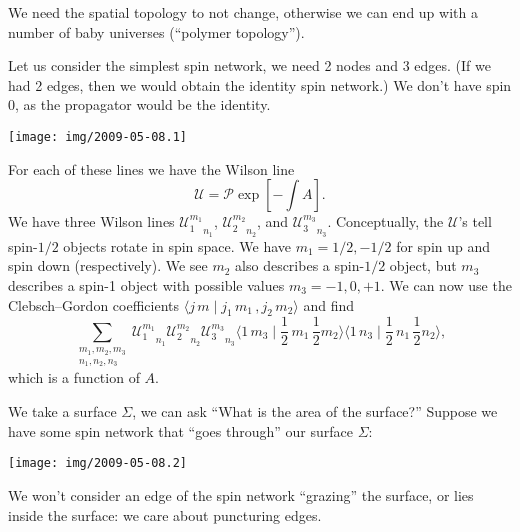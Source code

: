 \lecture

We need the spatial topology to not change, otherwise we can end up with
a number of baby universes (``polymer topology'').

Let us consider the simplest spin network, we need 2 nodes and 3
edges. (If we had 2 edges, then we would obtain the identity spin
network.)
We don't have spin 0, as the propagator would be the identity.
\begin{center}
  \texttt{[image: img/2009-05-08.1]}
\end{center}
For each of these lines we have the Wilson line
\begin{equation}
\mathcal{U} = \mathcal{P}\exp[-\int A].
\end{equation}
We have three Wilson lines ${\mathcal{U}^{m_{1}}_{1}}_{n_{1}}$,
${\mathcal{U}^{m_{2}}_{2}}_{n_{2}}$, and ${\mathcal{U}^{m_{3}}_{3}}_{n_{3}}$.
Conceptually, the $\mathcal{U}$'s tell spin-$1/2$ objects rotate in spin
space. We have $m_{1}=1/2, -1/2$ for spin up and spin down (respectively).
We see $m_{2}$ also describes a spin-$1/2$ object, but $m_{3}$ describes
a spin-1 object with possible values $m_{3}=-1,0,+1$. We can now use the
Clebsch--Gordon coefficients $\langle j\,m\mid j_{1}\,m_{1}\,, j_{2}\,m_{2}\rangle$
and find
\begin{equation}
  \sum_{\substack{m_{1},m_{2},m_{3}\\ n_{1},n_{2},n_{3}}}
  {\mathcal{U}^{m_{1}}_{1}}_{n_{1}}{\mathcal{U}^{m_{2}}_{2}}_{n_{2}}{\mathcal{U}^{m_{3}}_{3}}_{n_{3}}
\langle1\,m_{3}\mid\frac{1}{2}\,m_{1}\,\frac{1}{2}m_{2}\rangle
\langle1\,n_{3}\mid\frac{1}{2}\,n_{1}\,\frac{1}{2}n_{2}\rangle,
\end{equation}
which is a function of $A$.

We take a surface $\Sigma$, we can ask ``What is the area of the
surface?'' Suppose we have some spin network that ``goes through'' our
surface $\Sigma$:
\begin{center}
  \texttt{[image: img/2009-05-08.2]}
\end{center}
We won't consider an edge of the spin network ``grazing'' the surface,
or lies inside the surface: we care about puncturing edges.


